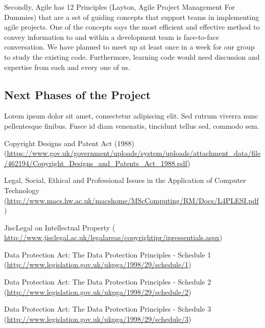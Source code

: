 	Secondly, Agile has 12 Principles (Layton, Agile Project Management For Dummies) that are a set of guiding concepts that support teams in implementing agile projects. One of the concepts says the most efficient and effective method to convey information to and within a development team is face-to-face conversation. We have planned to meet up at least once in a week for our group to study the existing code. Furthermore, learning code would need discussion and expertise from each and every one of us. 

\subsection*{Next Phases of the Project}
Lorem ipsum dolor sit amet, consectetur adipiscing elit. Sed rutrum viverra nunc pellentesque finibus. Fusce id diam venenatis, tincidunt tellus sed, commodo sem.

\newpage
\begin{thebibliography}{99}

 Copyright Designs and Patent Act (1988)
\newline
(\url{https://www.gov.uk/government/uploads/system/uploads/attachment_data/file/462194/Copyright_Designs_and_Patents_Act_1988.pdf})

 Legal, Social, Ethical and Professional Issues in the Application of Computer Technology 
\newline
(\url{http://www.macs.hw.ac.uk/macshome/MScComputing/RM/Docs/L4PLESI.pdf})

 JiscLegal on Intellectual Property
\newline
(\url{ http://www.jisclegal.ac.uk/legalareas/copyrightipr/ipressentials.aspx})

 Data Protection Act: The Data Protection Principles - Schedule 1
\newline
(\url{http://www.legislation.gov.uk/ukpga/1998/29/schedule/1})

 Data Protection Act: The Data Protection Principles - Schedule 2
\newline
(\url{http://www.legislation.gov.uk/ukpga/1998/29/schedule/2})

 Data Protection Act: The Data Protection Principles - Schedule 3
\newline
(\url{http://www.legislation.gov.uk/ukpga/1998/29/schedule/3})

\end{thebibliography}


